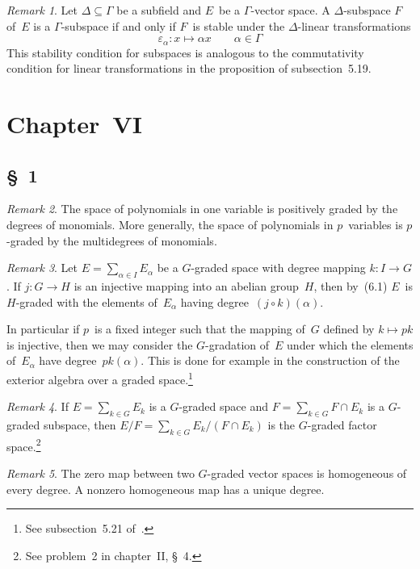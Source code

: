 \documentclass[letterpaper,12pt]{article}
\newcommand{\sect}{\cap}
\newcommand{\after}{\circ}
\theoremstyle{definition}
\theoremstyle{remark}
\newtheorem*{rmk}{Remark}
\begin{document}
\begin{rmk}
Let \(\Delta\subseteq\Gamma\) be a subfield and \(E\)~be a \(\Gamma\)-vector space. A \(\Delta\)-subspace \(F\) of~\(E\) is a \(\Gamma\)-subspace if and only if \(F\)~is stable under the \(\Delta\)-linear transformations
\[\varepsilon_{\alpha}:x\mapsto\alpha x\qquad\alpha\in\Gamma\]
This stability condition for subspaces is analogous to the commutativity condition for linear transformations in the proposition of subsection~5.19.
\end{rmk}

\newpage
\section*{Chapter~VI}
\subsection*{\S~1}
\begin{rmk}
The space of polynomials in one variable is positively graded by the degrees of monomials. More generally, the space of polynomials in \(p\)~variables is \(p\)-graded by the multidegrees of monomials.
\end{rmk}

\begin{rmk}
Let \(E=\sum_{\alpha\in I}E_{\alpha}\) be a \(G\)-graded space with degree mapping \(k:I\to G\). If \(j:G\to H\) is an injective mapping into an abelian group~\(H\), then by~(6.1) \(E\)~is \(H\)-graded with the elements of~\(E_{\alpha}\) having degree~\((j\after k)(\alpha)\).

In particular if \(p\)~is a fixed integer such that the mapping of~\(G\) defined by \(k\mapsto pk\) is injective, then we may consider the \(G\)-gradation of~\(E\) under which the elements of~\(E_{\alpha}\) have degree~\(pk(\alpha)\). This is done for example in the construction of the exterior algebra over a graded space.\footnote{See subsection~5.21 of~\cite{greub2}.}
\end{rmk}

\begin{rmk}
If \(E=\sum_{k\in G}E_k\) is a \(G\)-graded space and \(F=\sum_{k\in G}F\sect E_k\) is a \(G\)-graded subspace, then \(E/F=\sum_{k\in G}E_k/(F\sect E_k)\) is the \(G\)-graded factor space.\footnote{See problem~2 in chapter~II, \S~4.}
\end{rmk}

\begin{rmk}
The zero map between two \(G\)-graded vector spaces is homogeneous of every degree. A nonzero homogeneous map has a unique degree.
\end{rmk}
\end{document}
